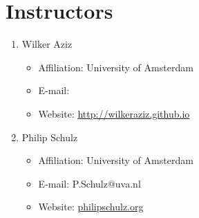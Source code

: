 \section{Instructors}

\begin{enumerate}
\item Wilker Aziz
\begin{itemize}
\item Affiliation: University of Amsterdam
\item E-mail: 
\item Website: \url{http://wilkeraziz.github.io}
\end{itemize}
\item Philip Schulz
\begin{itemize}
\item Affiliation: University of Amsterdam
\item E-mail: P.Schulz@uva.nl
\item Website: \url{philipschulz.org}
\end{itemize}
\end{enumerate}